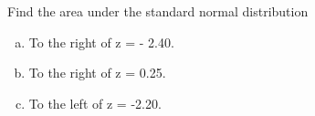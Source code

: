 \documentclass[english,lecture,12pt]{gWmaths}
\begin{document}

\begin{Exercise}
Find the area under the standard normal distribution 
\begin{enumerate}[a.]
\item To the right of z = - 2.40.
\vspace{10 in}
\item To the right of z = 0.25.
\vspace{10 in}


\item To the left of z = -2.20.
\vspace{10 in}
\end{enumerate}
\end{Exercise}
\end{document}
